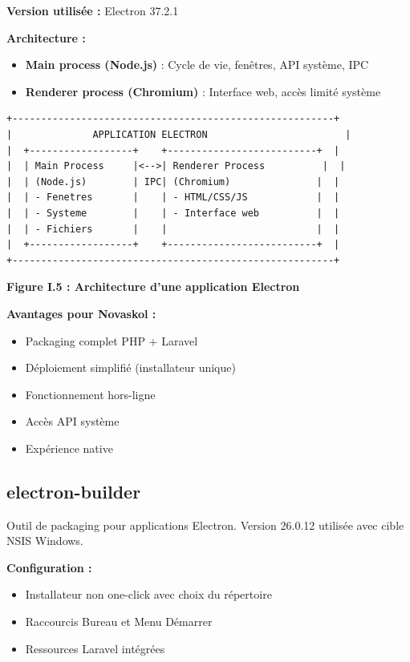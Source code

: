 \documentclass[12pt,a4paper,twoside]{report}
\begin{document}
\textbf{Version utilisée :} Electron 37.2.1

\textbf{Architecture :}
\begin{itemize}
    \item \textbf{Main process (Node.js)} : Cycle de vie, fenêtres, API système, IPC
    \item \textbf{Renderer process (Chromium)} : Interface web, accès limité système
\end{itemize}

\begin{verbatim}
+--------------------------------------------------------+
|              APPLICATION ELECTRON                        |
|  +------------------+    +--------------------------+  |
|  | Main Process     |<-->| Renderer Process          |  |
|  | (Node.js)        | IPC| (Chromium)               |  |
|  | - Fenetres       |    | - HTML/CSS/JS            |  |
|  | - Systeme        |    | - Interface web          |  |
|  | - Fichiers       |    |                          |  |
|  +------------------+    +--------------------------+  |
+--------------------------------------------------------+
\end{verbatim}

\begin{center}
\textbf{Figure I.5 : Architecture d'une application Electron}
\end{center}

\textbf{Avantages pour Novaskol :}
\begin{itemize}
    \item Packaging complet PHP + Laravel
    \item Déploiement simplifié (installateur unique)
    \item Fonctionnement hors-ligne
    \item Accès API système
    \item Expérience native
\end{itemize}

\subsection{electron-builder}

Outil de packaging pour applications Electron. Version 26.0.12 utilisée avec cible NSIS Windows.

\textbf{Configuration :}
\begin{itemize}
    \item Installateur non one-click avec choix du répertoire
    \item Raccourcis Bureau et Menu Démarrer
    \item Ressources Laravel intégrées
\end{itemize}
\end{document}
